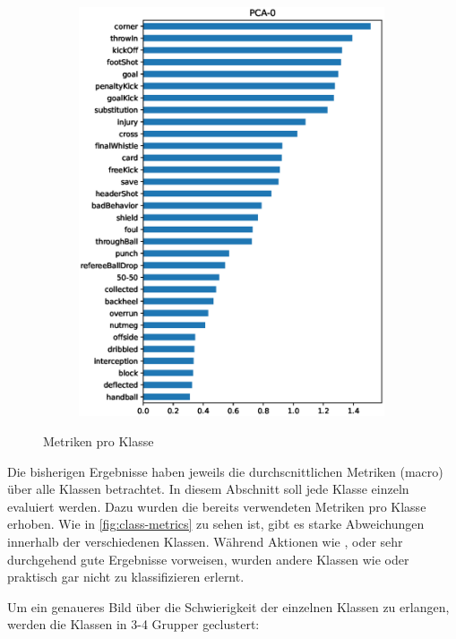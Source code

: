 \begin{figure}
\begin{subfigure}{.24\textwidth}
        \includegraphics[width=0.99\textwidth, keepaspectratio, interpolate]{img/07_PCA_by_class_test_202012-2218-2843.eps}
    \end{subfigure}
    \caption{Metriken pro Klasse}
    \label{fig:class-metrics}
\end{figure}

Die bisherigen Ergebnisse haben jeweils die durchscnittlichen Metriken (macro) über alle Klassen betrachtet.
In diesem Abschnitt soll jede Klasse einzeln evaluiert werden.
Dazu wurden die bereits verwendeten Metriken pro Klasse erhoben.
Wie in \autoref{fig:class-metrics} zu sehen ist, gibt es starke Abweichungen innerhalb der verschiedenen Klassen.
Während Aktionen wie ,  oder  sehr durchgehend gute Ergebnisse vorweisen, wurden andere Klassen wie  oder  praktisch gar nicht zu klassifizieren erlernt.

Um ein genaueres Bild über die Schwierigkeit der einzelnen Klassen zu erlangen, werden die Klassen in 3-4 Grupper geclustert:

